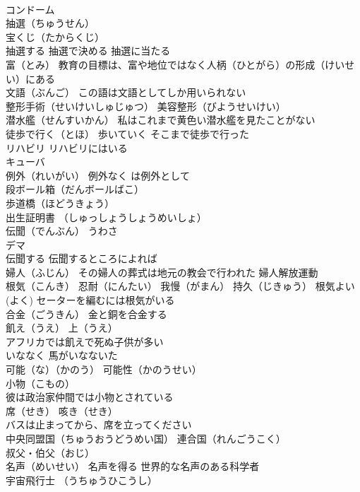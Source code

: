 \documentclass[8pt]{extreport}
\begin{document}
\begin{CJK}{UTF8}{min}
\\	コンドーム
\\	抽選（ちゅうせん）
\\	宝くじ（たからくじ）
\\	抽選する 抽選で決める 抽選に当たる
\\	富（とみ） 教育の目標は、富や地位ではなく人柄（ひとがら）の形成（けいせい）にある
\\	文語（ぶんご） この語は文語としてしか用いられない
\\	整形手術（せいけいしゅじゅつ） 美容整形（びようせいけい）
\\	潜水艦（せんすいかん） 私はこれまで黄色い潜水艦を見たことがない
\\	徒歩で行く（とほ） 歩いていく そこまで徒歩で行った
\\	リハビリ リハビリにはいる
\\	キューバ
\\	例外（れいがい） 例外なく は例外として
\\	段ボール箱（だんボールばこ）
\\	歩道橋（ほどうきょう）
\\	出生証明書 （しゅっしょうしょうめいしょ）
\\	伝聞（でんぶん） うわさ 
\\	デマ 
\\	伝聞する 伝聞するところによれば
\\	婦人（ふじん） その婦人の葬式は地元の教会で行われた 婦人解放運動
\\	根気（こんき） 忍耐（にんたい） 我慢（がまん） 持久（じきゅう） 根気よい (よく) セーターを編むには根気がいる
\\	合金（ごうきん） 金と銅を合金する
\\	飢え（うえ） 上（うえ）
\\	アフリカでは飢えで死ぬ子供が多い
\\	いななく 馬がいなないた
\\	可能（な）（かのう） 可能性（かのうせい）
\\	小物（こもの） 
\\	彼は政治家仲間では小物とされている
\\	席（せき） 咳き（せき）　
\\	バスは止まってから、席を立ってください
\\	中央同盟国（ちゅうおうどうめい国） 連合国（れんごうこく）
\\	叔父・伯父（おじ）
\\	名声（めいせい） 名声を得る 世界的な名声のある科学者
\\	宇宙飛行士 （うちゅうひこうし）

\end{CJK}
\end{document}

